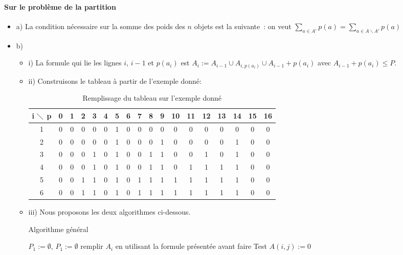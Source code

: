 \paragraph{Sur le problème de la partition}

\begin{itemize}
\item a) La condition nécessaire sur la somme des poids des $n$ objets
  est la suivante~: on veut $\sum_{a \in A'} p(a)= \sum_{a \in A
    \backslash A'}p(a)$
\item b) 
\begin{itemize}
\item i) La formule qui lie les lignes $i$, $i-1$ et $p(a_i)$ est $A_i
  := A_{i-1} \cup A_{i, p(a_i)} \cup A_{i-1}+p(a_i)$ avec
  $A_{i-1}+p(a_i) \leq P$.
\item ii) Construisons le tableau à partir de l'exemple donné:
\begin{table}[h!]
\centering
	\begin{tabular}{|c|c|c|c|c|c|c|c|c|c|c|c|c|c|c|c|c|c|}
    \hline
     i $\diagdown$ p & 0 & 1 & 2 & 3 & 4 & 5 & 6 & 7 & 8 & 9 & 10 & 11 & 12 & 13 & 14 & 15 & 16 \\
    \hline
   1 & 0 & 0 & 0 & 0 & 0 & 1 & 0 & 0 & 0 & 0 & 0 & 0 & 0 & 0 & 0 & 0 & 0 \\
     \hline
	2& 0 & 0 & 0 & 0 & 0 & 1 & 0 & 0 & 0 & 1 & 0 & 0 & 0 & 0 & 1 & 0 & 0 \\
   \hline
	3 & 0 & 0 & 0 & 1 & 0 & 1 & 0 & 0 & 1 & 1 & 0 & 0 & 1 & 0 & 1 & 0 & 0 \\
	\hline
	4 & 0 & 0 & 0 & 1 & 0 & 1 & 0 & 0 & 1 & 1 & 0 & 1 & 1 & 1 & 1 & 0 & 0 \\
	  \hline
	5 & 0 & 0 & 1 & 1 & 0 & 1 & 0 & 1 & 1 & 1 & 1 & 1 & 1 & 1 & 1 & 0 & 0 \\
	\hline
	6 & 0 & 0 & 1 & 1 & 0 & 1 & 0 & 1 & 1 & 1 & 1 & 1 & 1 & 1 & 1 & 0 & 0 \\
	\hline
\end{tabular}
\caption {Remplissage du tableau sur l'exemple donné}
\end{table} 
\item iii) Nous proposons les deux algorithmes ci-dessous.
\begin{algorithm}[t]
\caption{Algorithme général}
\label{algoexo7}
\begin{algorithmic}[1]
\STATE $P_1 := \emptyset $,  $P_1 := \emptyset $
\STATE remplir $A_i$ en utilisant la formule présentée avant
\STATE faire Test
\STATE $A(i,j):=0$
\ENDIF
\ENDWHILE
\ENDFOR
\end{algorithmic}
\end{algorithm}


\end{itemize}
\end{itemize}
